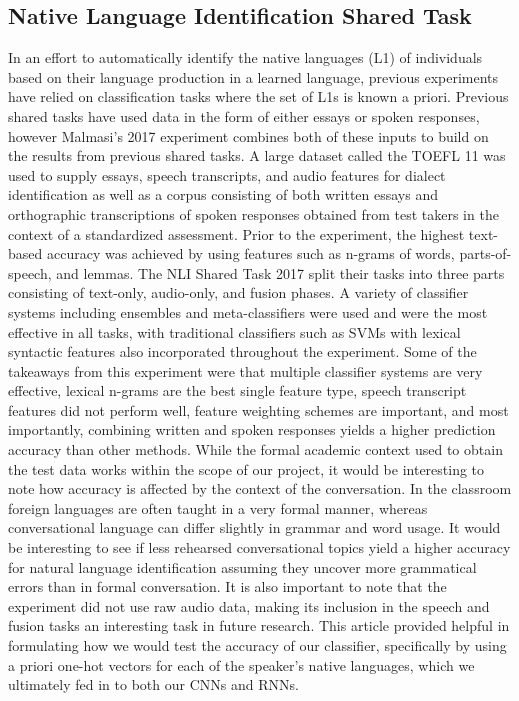 \documentclass[11pt,a4paper]{article}
\newcommand\tab[1][1cm]{\hspace*{#1}}
\begin{document}
 \subsection{Native Language Identification Shared Task}
 \tab In an effort to automatically identify the native languages (L1) of individuals based on their language production in a learned language, previous experiments have relied on classification tasks where the set of L1s is known a priori. Previous shared tasks have used data in the form of either essays or spoken responses, however Malmasi's 2017 experiment combines both of these inputs to build on the results from previous shared tasks. A large dataset called the TOEFL 11 was used to supply essays, speech transcripts, and audio features for dialect identification as well as a corpus consisting of both written essays and orthographic transcriptions of spoken responses obtained from test takers in the context of a standardized assessment. Prior to the experiment, the highest text-based accuracy was achieved by using features such as n-grams of words, parts-of-speech, and lemmas. The NLI Shared Task 2017 split their tasks into three parts consisting of text-only, audio-only, and fusion phases. A variety of classifier systems including ensembles and meta-classifiers were used and were the most effective in all tasks, with traditional classifiers such as SVMs with lexical syntactic features also incorporated throughout the experiment. Some of the takeaways from this experiment were that multiple classifier systems are very effective, lexical n-grams are the best single feature type, speech transcript features did not perform well, feature weighting schemes are important, and most importantly, combining written and spoken responses yields a higher prediction accuracy than other methods. While the formal academic context used to obtain the test data works within the scope of our project, it would be interesting to note how accuracy is affected by the context of the conversation. In the classroom foreign languages are often taught in a very formal manner, whereas conversational language can differ slightly in grammar and word usage. It would be interesting to see if less rehearsed conversational topics yield a higher accuracy for natural language identification assuming they uncover more grammatical errors than in formal conversation. It is also important to note that the experiment did not use raw audio data, making its inclusion in the speech and fusion tasks an interesting task in future research. This article provided helpful in formulating how we would test the accuracy of our classifier, specifically by using a priori one-hot vectors for each of the speaker's native languages, which we ultimately fed in to both our CNNs and RNNs.
\end{document}
